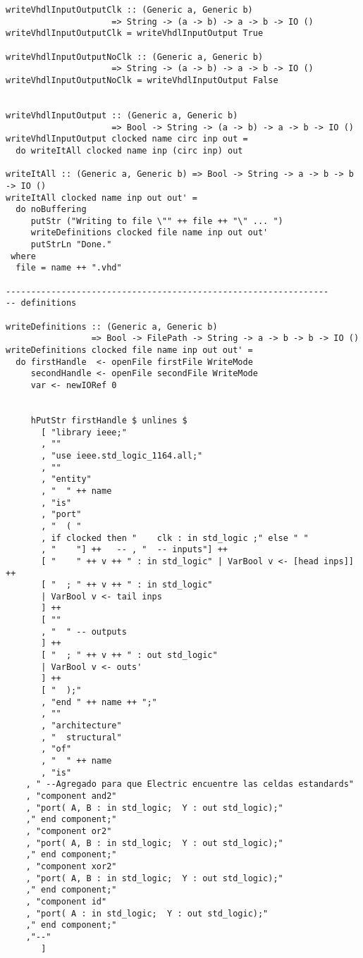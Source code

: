 \begin{lstlisting}[mathescape=false]
writeVhdlInputOutputClk :: (Generic a, Generic b)
                     => String -> (a -> b) -> a -> b -> IO ()
writeVhdlInputOutputClk = writeVhdlInputOutput True

writeVhdlInputOutputNoClk :: (Generic a, Generic b)
                     => String -> (a -> b) -> a -> b -> IO ()
writeVhdlInputOutputNoClk = writeVhdlInputOutput False


writeVhdlInputOutput :: (Generic a, Generic b)
                     => Bool -> String -> (a -> b) -> a -> b -> IO ()
writeVhdlInputOutput clocked name circ inp out =
  do writeItAll clocked name inp (circ inp) out

writeItAll :: (Generic a, Generic b) => Bool -> String -> a -> b -> b -> IO ()
writeItAll clocked name inp out out' =
  do noBuffering
     putStr ("Writing to file \"" ++ file ++ "\" ... ")
     writeDefinitions clocked file name inp out out'
     putStrLn "Done."
 where
  file = name ++ ".vhd"
  
----------------------------------------------------------------
-- definitions

writeDefinitions :: (Generic a, Generic b)
                 => Bool -> FilePath -> String -> a -> b -> b -> IO ()
writeDefinitions clocked file name inp out out' =
  do firstHandle  <- openFile firstFile WriteMode
     secondHandle <- openFile secondFile WriteMode
     var <- newIORef 0
     

     hPutStr firstHandle $ unlines $
       [ "library ieee;"
       , ""
       , "use ieee.std_logic_1164.all;"
       , ""
       , "entity"
       , "  " ++ name
       , "is"
       , "port"
       , "  ( "
       , if clocked then "    clk : in std_logic ;" else " "
       , "    "] ++   -- , "  -- inputs"] ++
       [ "    " ++ v ++ " : in std_logic" | VarBool v <- [head inps]] ++
       [ "  ; " ++ v ++ " : in std_logic"
       | VarBool v <- tail inps
       ] ++
       [ ""
       , "  " -- outputs
       ] ++
       [ "  ; " ++ v ++ " : out std_logic"
       | VarBool v <- outs'
       ] ++
       [ "  );"
       , "end " ++ name ++ ";"
       , ""
       , "architecture"
       , "  structural"
       , "of"
       , "  " ++ name
       , "is"
	, " --Agregado para que Electric encuentre las celdas estandards"
	, "component and2"
	, "port( A, B : in std_logic;  Y : out std_logic);"
	," end component;"
	, "component or2"
	, "port( A, B : in std_logic;  Y : out std_logic);"
	," end component;"
	, "component xor2"
	, "port( A, B : in std_logic;  Y : out std_logic);"
	," end component;"
	, "component id"
	, "port( A : in std_logic;  Y : out std_logic);"
	," end component;"
	,"--"
       ]


\end{lstlisting}
